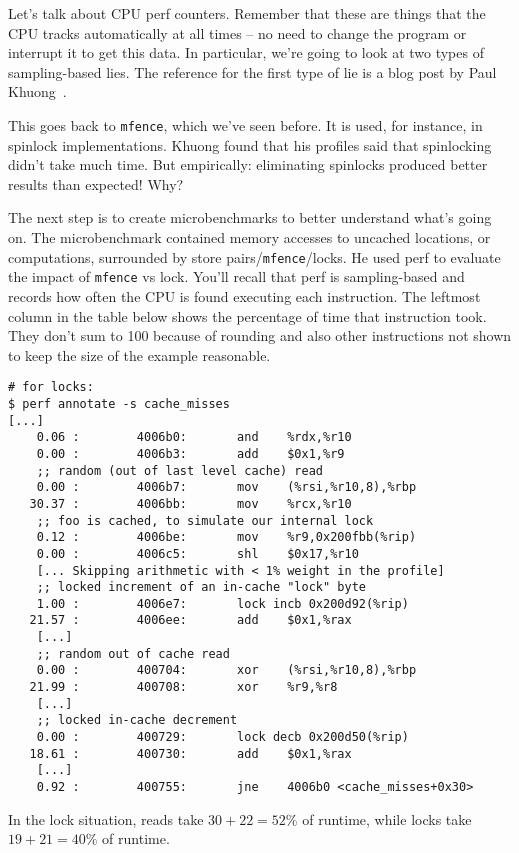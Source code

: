 Let's talk about CPU perf counters. Remember that these are things that the CPU tracks automatically at all times -- no need to change the program or interrupt it to get this data. In particular, we're going to look at two types of sampling-based lies. The reference for the first type of lie is a blog post by Paul Khuong~\cite{metrics}.

This goes back to {\tt mfence}, which we've seen before. It is used, for instance, in
spinlock implementations. Khuong found that his profiles said that spinlocking didn't take much time.
But empirically: eliminating spinlocks produced better results than expected! Why?

The next step is to create microbenchmarks to better understand what's
going on. The microbenchmark contained memory accesses to uncached locations, or computations,
surrounded by store pairs/\texttt{mfence}/locks. He used perf to evaluate the impact of \texttt{mfence} vs lock.
You'll recall that perf is sampling-based and records how often the CPU is found executing each instruction. The leftmost column in the table below shows the percentage of time that instruction took. They don't sum to 100 because of rounding and also other instructions not shown to keep the size of the example reasonable.

{\scriptsize
\begin{lstlisting}
# for locks:
$ perf annotate -s cache_misses
[...]
    0.06 :        4006b0:       and    %rdx,%r10
    0.00 :        4006b3:       add    $0x1,%r9
    ;; random (out of last level cache) read
    0.00 :        4006b7:       mov    (%rsi,%r10,8),%rbp
   30.37 :        4006bb:       mov    %rcx,%r10
    ;; foo is cached, to simulate our internal lock
    0.12 :        4006be:       mov    %r9,0x200fbb(%rip)
    0.00 :        4006c5:       shl    $0x17,%r10
    [... Skipping arithmetic with < 1% weight in the profile]
    ;; locked increment of an in-cache "lock" byte
    1.00 :        4006e7:       lock incb 0x200d92(%rip)
   21.57 :        4006ee:       add    $0x1,%rax
    [...]
    ;; random out of cache read
    0.00 :        400704:       xor    (%rsi,%r10,8),%rbp
   21.99 :        400708:       xor    %r9,%r8
    [...]
    ;; locked in-cache decrement
    0.00 :        400729:       lock decb 0x200d50(%rip)
   18.61 :        400730:       add    $0x1,%rax
    [...]
    0.92 :        400755:       jne    4006b0 <cache_misses+0x30>
\end{lstlisting}
}

In the lock situation, reads take $30 + 22 = 52\%$ of runtime,
while locks take $19 + 21 = 40\%$ of runtime.

